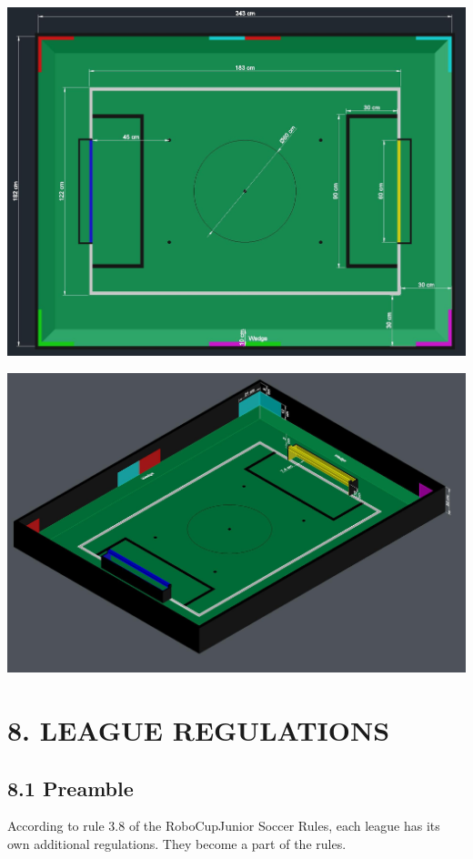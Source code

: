 \documentclass{article}
\begin{document}
\includegraphics[width=1\textwidth]{media/image6.jpeg}

\includegraphics[width=1\textwidth]{media/image7.jpeg}

\section{8. LEAGUE REGULATIONS \label{ref-052}}

\subsection{8.1 Preamble \label{ref-053}}

According to rule \textcolor{color-5}{3.8} of the RoboCupJunior Soccer Rules, each league has its own additional regulations. They become a part of the rules.
\end{document}

